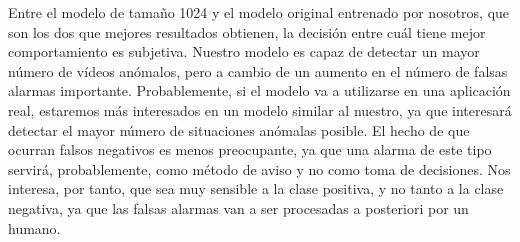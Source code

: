 \documentclass[../main.tex]{memoir}
\begin{document}
Entre el modelo de tamaño 1024 y el modelo original entrenado por
nosotros, que son los dos que mejores resultados obtienen, la decisión
entre cuál tiene mejor comportamiento es subjetiva. Nuestro modelo es
capaz de detectar un mayor número de vídeos anómalos, pero a cambio de
un aumento en el número de falsas alarmas importante. Probablemente,
si el modelo va a utilizarse en una aplicación real, estaremos más
interesados en un modelo similar al nuestro, ya que interesará
detectar el mayor número de situaciones anómalas posible. El hecho de
que ocurran falsos negativos es menos preocupante, ya que una alarma
de este tipo servirá, probablemente, como método de aviso y no como
toma de decisiones. Nos interesa, por tanto, que sea muy sensible
a la clase positiva, y no tanto a la clase negativa, ya que las falsas
alarmas van a ser procesadas a posteriori por un humano.\\
\end{document}
